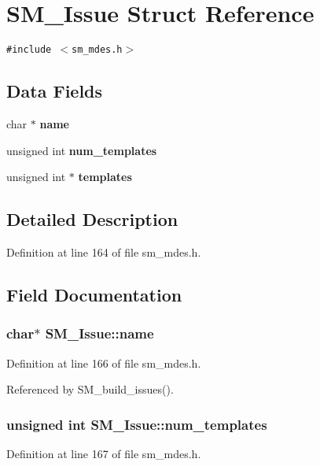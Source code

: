 \section{SM\_\-Issue Struct Reference}
\label{structSM__Issue}
{\tt \#include $<$sm\_\-mdes.h$>$}

\subsection*{Data Fields}
\begin{CompactItemize}
\item 
char $\ast$ \bf{name}
\item 
unsigned int \bf{num\_\-templates}
\item 
unsigned int $\ast$ \bf{templates}
\end{CompactItemize}


\subsection{Detailed Description}




Definition at line 164 of file sm\_\-mdes.h.

\subsection{Field Documentation}
\subsubsection{\setlength{\rightskip}{0pt plus 5cm}char$\ast$ \bf{SM\_\-Issue::name}}\label{structSM__Issue_c0d2e5345d3a847fd24578590c170ed8}




Definition at line 166 of file sm\_\-mdes.h.

Referenced by SM\_\-build\_\-issues().
\subsubsection{\setlength{\rightskip}{0pt plus 5cm}unsigned int \bf{SM\_\-Issue::num\_\-templates}}\label{structSM__Issue_0aebda34aa38889b6d0a3486c1cc7485}




Definition at line 167 of file sm\_\-mdes.h.

